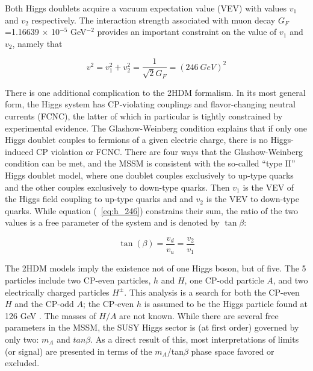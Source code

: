 

Both Higgs doublets acquire a vacuum expectation value (VEV) with values $v_1$ 
and $v_2$ respectively.  The interaction strength associated with
muon decay $G_F$=1.16639 $\times$ 10$^{-5}$ GeV$^{-2}$ 
provides an important constraint on the value of $v_1$ and $v_2$, namely that 

\begin{equation}
	v^2 = v_1^2 + v_2^2 = \frac{1}{\sqrt{2}G_F} = (246\ GeV)^2
	\label{eq:h_246}
\end{equation}


There is one additional complication to the 2HDM formalism.  In its most general form, 
the Higgs system has CP-violating couplings and flavor-changing neutral currents 
(FCNC), the latter of which in particular is tightly constrained by experimental evidence.  
The Glashow-Weinberg condition explains that if only one Higgs doublet couples to fermions 
of a given electric charge, there is no Higgs-induced CP violation or 
FCNC.  There are four ways that the Glashow-Weinberg condition can be met, 
and the MSSM is consistent with the so-called ``type II'' Higgs 
doublet model, where one doublet couples exclusively to up-type quarks and the 
other couples exclusively to down-type quarks.  Then $v_1$ 
is the VEV of the Higgs field coupling to up-type quarks and and $v_2$ 
is the VEV to down-type quarks.  While equation (~\ref{eq:h_246}) 
constrains their sum, the ratio of the two values is a free parameter of 
the system and is denoted by $\tan\beta$:

\begin{equation}
	\tan(\beta) = \frac{v_d}{v_u} = \frac{v_2}{v_1}
\end{equation}




The 2HDM models imply the existence not of one Higgs boson, but of five.  
The 5 particles include two CP-even particles, $h$ and $H$, 
one CP-odd particle $A$, and two electrically charged particles $H^\pm$.   
This analysis is a search for both the CP-even $H$ and 
the CP-odd $A$; the CP-even $h$ is 
assumed to be the Higgs particle found at 126 GeV \cite{PDG-Review}.  
The masses of $H/A$ are not known.  While there are several free parameters in the MSSM, the SUSY Higgs sector is 
(at first order) governed by only two: $m_A$ 
and $tan\beta$.  As a direct result of this, most interpretations 
of limits (or signal) are presented in terms of the $m_A$/tan$\beta$ phase space favored or excluded.  




